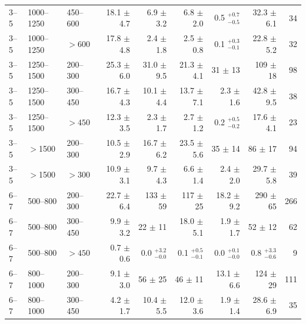 \begin{table}[!hp]
{\begin{tabular}{lll|r|r|r|r|r|r}
      3--5     & 1000--1250  & 450--600  &   18.1 $\pm$    4.7       &    6.9 $\pm$    3.2      &   6.8 $\pm$    2.0      &  0.5 $^{+0.7}_{-0.5}$       & 32.3   $\pm$    6.1    &    34  \\
      3--5     & 1000--1250  & $>600$   &   17.8 $\pm$    4.8       &    2.4 $\pm$    1.8      &   2.5 $\pm$    0.8      &  0.1 $^{+0.3}_{-0.1}$       & 22.8   $\pm$    5.2    &    32  \\ \hline
      3--5     & 1250--1500  & 200--300  &   25.3 $\pm$    6.0       &   31.0 $\pm$    9.5      &  21.3 $\pm$    4.1      & 31   $\pm$   13         & 109    $\pm$   18      &    98  \\
      3--5     & 1250--1500  & 300--450  &   16.7 $\pm$    4.3       &   10.1 $\pm$    4.4      &  13.7 $\pm$    7.1      &  2.3 $\pm$    1.6       & 42.8   $\pm$    9.5    &    38  \\
      3--5     & 1250--1500  & $>450$   &   12.3 $\pm$    3.5       &    2.3 $\pm$    1.7      &   2.7 $\pm$    1.2      &  0.2 $^{+0.5}_{-0.2}$       & 17.6   $\pm$    4.1    &    23  \\ \hline
      3--5     & $>$1500    & 200--300  &   10.5 $\pm$    2.9       &   16.7 $\pm$    6.2      &  23.5 $\pm$    5.6      & 35   $\pm$   14         & 86     $\pm$   17      &    94  \\
      3--5     & $>$1500    & $>300$   &   10.9 $\pm$    3.1       &    9.7 $\pm$    4.3      &   6.6 $\pm$    1.4      &  2.4 $\pm$    2.0       & 29.7   $\pm$    5.8    &    39  \\ \hline \hline
      6--7     & 500--800    & 200--300  &   22.7 $\pm$    6.4       &  133   $\pm$   59        & 117   $\pm$   25        & 18.2 $\pm$    9.2       & 290    $\pm$   65      &   266  \\
      6--7     & 500--800    & 300--450  &    9.9 $\pm$    3.2       &   22   $\pm$   11        &  18.0 $\pm$    5.1      &  1.9 $\pm$    1.7       & 52     $\pm$   12      &    62  \\
      6--7     & 500--800    & $>450$   &    0.7 $\pm$    0.6       &    0.0 $^{+3.2}_{-0.0}$      &   0.1 $^{+0.5}_{-0.1}$      &  0.0 $^{+0.1}_{-0.0}$       & 0.8    $^{+3.3}_{-0.6}$    &     9  \\ \hline
      6--7     & 800--1000   & 200--300  &    9.1 $\pm$    3.0       &   56   $\pm$   25        &  46   $\pm$   11        & 13.1 $\pm$    6.6       & 124    $\pm$   29      &   111  \\
      6--7     & 800--1000   & 300--450  &    4.2 $\pm$    1.7       &   10.4 $\pm$    5.5      &  12.0 $\pm$    3.6      &  1.9 $\pm$    1.4       & 28.6   $\pm$    6.9    &    35  \\

\end{tabular}}
\end{table}
